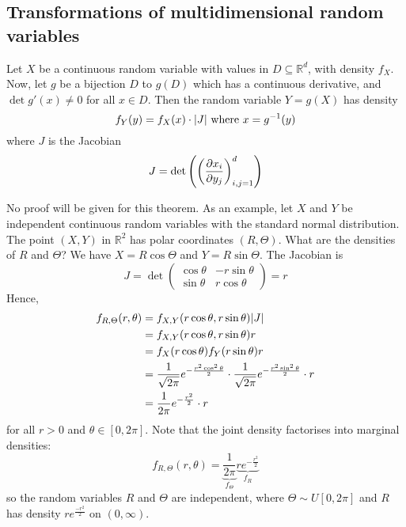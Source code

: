 \subsection{Transformations of multidimensional random variables}
\begin{theorem}
	Let \(X\) be a continuous random variable with values in \(D \subseteq \mathbb R^d\), with density \(f_X\).
	Now, let \(g\) be a bijection \(D\) to \(g(D)\) which has a continuous derivative, and \(\det g'(x) \neq 0\) for all \(x \in D\).
	Then the random variable \(Y = g(X)\) has density
	\[
		f_Y(y) = f_X(x) \cdot \abs{J} \text{ where } x = g^{-1}(y)
	\]
	where \(J\) is the Jacobian
	\[
		J = \det \left( \left( \pdv{x_i}{y_j} \right)_{i, j = 1}^d \right)
	\]
\end{theorem}
\noindent No proof will be given for this theorem.
As an example, let \(X\) and \(Y\) be independent continuous random variables with the standard normal distribution.
The point \((X, Y)\) in \(\mathbb R^2\) has polar coordinates \((R, \Theta)\).
What are the densities of \(R\) and \(\Theta\)?
We have \(X = R\cos\Theta\) and \(Y = R\sin\Theta\).
The Jacobian is
\[
	J = \det\begin{pmatrix}
		\cos\theta & -r\sin\theta \\
		\sin\theta & r\cos\theta
	\end{pmatrix} = r
\]
Hence,
\begin{align*}
	f_{R, \Theta}(r, \theta) & = f_{X, Y}(r\cos\theta, r\sin\theta) \abs{J}                                                                            \\
	                         & = f_{X, Y}(r\cos\theta, r\sin\theta) r                                                                                  \\
	                         & = f_X(r\cos\theta) f_Y(r\sin\theta) r                                                                                   \\
	                         & = \frac{1}{\sqrt{2\pi}}e^{-\frac{r^2\cos^2\theta}{2}} \cdot \frac{1}{\sqrt{2\pi}}e^{-\frac{r^2\sin^2\theta}{2}} \cdot r \\
	                         & = \frac{1}{2\pi}e^{-\frac{r^2}{2}} \cdot r
\end{align*}
for all \(r > 0\) and \(\theta \in [0, 2\pi]\).
Note that the joint density factorises into marginal densities:
\[
	f_{R, \Theta}(r, \theta) = \underbrace{\frac{1}{2\pi}}_{f_\Theta} \underbrace{re^{-\frac{r^2}{2}}}_{f_R}
\]
so the random variables \(R\) and \(\Theta\) are independent, where \(\Theta \sim U[0, 2\pi]\) and \(R\) has density \(re^{\frac{-r^2}{2}}\) on \((0, \infty)\).

